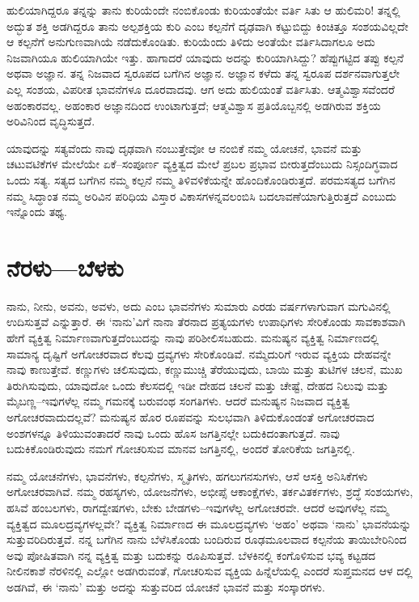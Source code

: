 ಹುಲಿಯಾಗಿದ್ದರೂ ತನ್ನನ್ನು ತಾನು ಕುರಿಯೆಂದೇ ನಂಬಿಕೊಂಡು ಕುರಿಯಂತೆಯೇ ವರ್ತಿ ಸಿತು ಆ ಹುಲಿಮರಿ! ತನ್ನಲ್ಲಿ ಅದ್ಭುತ ಶಕ್ತಿ ಅಡಗಿದ್ದರೂ ತಾನು ಅಲ್ಪಶಕ್ತಿಯ ಕುರಿ ಎಂಬ ಕಲ್ಪನೆಗೆ ದೃಢವಾಗಿ ಕಟ್ಟುಬಿದ್ದು ಕಿಂಚಿತ್ತೂ ಸಂಶಯವಿಲ್ಲದೇ ಆ ಕಲ್ಪನೆಗೆ ಅನುಗುಣವಾಗಿಯೆ ನಡೆದುಕೊಂಡಿತು. ಕುರಿಯೆಂದು ತಿಳಿದು ಅಂತೆಯೇ ವರ್ತಿಸಿದಾಗಲೂ ಅದು ನಿಜವಾಗಿಯೂ ಹುಲಿಯಾಗಿಯೇ ಇತ್ತು. ಹಾಗಾದರೆ ಯಾವುದು ಅದನ್ನು ಕುರಿಯಾಗಿಸಿದ್ದು? ಹೆಪ್ಪುಗಟ್ಟಿದ ತಪ್ಪು ಕಲ್ಪನೆ ಅಥವಾ ಅಜ್ಞಾನ. ತನ್ನ ನಿಜವಾದ ಸ್ವರೂಪದ ಬಗೆಗಿನ ಅಜ್ಞಾನ. ಅಜ್ಞಾನ ಕಳೆದು ತನ್ನ ಸ್ವರೂಪ ದರ್ಶನವಾಗುತ್ತಲೇ ಎಲ್ಲ ಸಂಶಯ, ವಿಪರೀತ ಭಾವನೆಗಳೂ ದೂರವಾದವು. ಆಗ ಅದು ಹುಲಿಯಂತೆ ವರ್ತಿಸಿತು. ಆತ್ಮವಿಶ್ವಾಸವೆಂದರೆ ಅಹಂಕಾರವಲ್ಲ. ಅಹಂಕಾರ ಅಜ್ಞಾನದಿಂದ ಉಂಟಾಗುತ್ತದೆ; ಆತ್ಮವಿಶ್ವಾಸ ಪ್ರತಿಯೊಬ್ಬನಲ್ಲಿ ಅಡಗಿರುವ ಶಕ್ತಿಯ ಅರಿವಿನಿಂದ ವೃದ್ಧಿಸುತ್ತದೆ.

ಯಾವುದನ್ನು ಸತ್ಯವೆಂದು ನಾವು ದೃಢವಾಗಿ ನಂಬುತ್ತೇವೋ ಆ ನಂಬಿಕೆ ನಮ್ಮ ಯೋಚನೆ, ಭಾವನೆ ಮತ್ತು ಚಟುವಟಿಕೆಗಳ ಮೇಲೆಯೇ ಏಕೆ–ಸಂಪೂರ್ಣ ವ್ಯಕ್ತಿತ್ವದ ಮೇಲೆ ಪ್ರಬಲ ಪ್ರಭಾವ ಬೀರುತ್ತದೆಂಬುದು ನಿಸ್ಸಂದಿಗ್ಧವಾದ ಒಂದು ಸತ್ಯ. ಸತ್ಯದ ಬಗೆಗಿನ ನಮ್ಮ ಕಲ್ಪನೆ ನಮ್ಮ ತಿಳಿವಳಿಕೆಯನ್ನೇ ಹೊಂದಿಕೊಂಡಿರುತ್ತದೆ. ಪರಮಸತ್ಯದ ಬಗೆಗಿನ ನಮ್ಮ ಸಿದ್ಧಾಂತ ನಮ್ಮ ಅರಿವಿನ ಪರಿಧಿಯ ವಿಸ್ತಾರ ವಿಕಾಸಗಳನ್ನವಲಂಬಿಸಿ ಬದಲಾವಣೆಯಾಗುತ್ತಿರುತ್ತದೆ ಎಂಬುದು ಇನ್ನೊಂದು ತಥ್ಯ.


\section*{ನೆರಳು—ಬೆಳಕು}


ನಾನು, ನೀನು, ಅವನು, ಅವಳು, ಅದು ಎಂಬ ಭಾವನೆಗಳು ಸುಮಾರು ಎರಡು ವರ್ಷಗಳಾಗುವಾಗ ಮಗುವಿನಲ್ಲಿ ಉದಿಸುತ್ತವೆ ಎನ್ನುತ್ತಾರೆ. ಈ ‘ನಾನು’ವಿಗೆ ನಾನಾ ತೆರನಾದ ಪ್ರತ್ಯಯಗಳು ಉಪಾಧಿಗಳು ಸೇರಿಕೊಂಡು ಸಾವಕಾಶವಾಗಿ ಹೇಗೆ ವ್ಯಕ್ತಿತ್ವ ನಿರ್ಮಾಣವಾಗುತ್ತದೆಂಬುದನ್ನು ನಾವು ಪರಿಶೀಲಿಸಬಹುದು. ಮನುಷ್ಯನ ವ್ಯಕ್ತಿತ್ವ ನಿರ್ಮಾಣದಲ್ಲಿ ಸಾಮಾನ್ಯ ದೃಷ್ಟಿಗೆ ಅಗೋಚರವಾದ ಕೆಲವು ದ್ರವ್ಯಗಳು ಸೇರಿಕೊಂಡಿವೆ. ನಮ್ಮೆದುರಿಗೆ ಇರುವ ವ್ಯಕ್ತಿಯ ದೇಹವನ್ನೇ ನಾವು ಕಾಣುತ್ತೇವೆ. ಕಣ್ಣುಗಳು ಚಲಿಸುವುದು, ಕಣ್ಣುಮುಚ್ಚಿ ತೆರೆಯುವುದು, ಬಾಯಿ ಮತ್ತು ತುಟಿಗಳ ಚಲನೆ, ಮುಖ ತಿರುಗಿಸುವುದು, ಯಾವುದೋ ಒಂದು ಕೆಲಸದಲ್ಲಿ ಇಡೀ ದೇಹದ ಚಲನೆ ಮತ್ತು ಚೇಷ್ಟೆ, ದೇಹದ ನಿಲುವು ಮತ್ತು ಮೈಬಣ್ಣ–ಇವುಗಳೆಲ್ಲ ನಮ್ಮ ಗಮನಕ್ಕೆ ಬರುವಂಥ ಸಂಗತಿಗಳು. ಆದರೆ ಮನುಷ್ಯನ ನಿಜವಾದ ವ್ಯಕ್ತಿತ್ವ ಅಗೋಚರವಾದುದಲ್ಲವೆ? ಮನುಷ್ಯನ ಹೊರ ರೂಪವನ್ನು ಸುಲಭವಾಗಿ ತಿಳಿದುಕೊಂಡಂತೆ ಅಗೋಚರವಾದ ಅಂಶಗಳನ್ನೂ ತಿಳಿಯುವಂತಾದರೆ ನಾವು ಒಂದು ಹೊಸ ಜಗತ್ತಿನಲ್ಲೇ ಬದುಕಿದಂತಾಗುತ್ತದೆ. ನಾವು ಬದುಕಿಕೊಂಡಿರುವುದು ನಮಗೆ ಗೋಚರಿಸುವ ಮಾನವ ಜಗತ್ತಿನಲ್ಲಿ, ಅಂದರೆ ತೋರಿಕೆಯ ಜಗತ್ತಿನಲ್ಲಿ.

ನಮ್ಮ ಯೋಚನೆಗಳು, ಭಾವನೆಗಳು, ಕಲ್ಪನೆಗಳು, ಸ್ಮೃತಿಗಳು, ಹಗಲುಗನಸುಗಳು, ಆಸೆ ಆಸಕ್ತಿ ಅನಿಸಿಕೆಗಳು ಅಗೋಚರವಾಗಿವೆ. ನಮ್ಮ ರಹಸ್ಯಗಳು, ಯೋಜನೆಗಳು, ಅಭೀಪ್ಸೆ ಆಕಾಂಕ್ಷೆಗಳು, ತರ್ಕವಿತರ್ಕಗಳು, ಶ್ರದ್ಧೆ ಸಂಶಯಗಳು, ಹಸಿವೆ ಹಂಬಲಗಳು, ರಾಗದ್ವೇಷಗಳು, ಬೇಕು ಬೇಡಗಳು–ಇವುಗಳೆಲ್ಲ ಅಗೋಚರವೇ. ಆದರೆ ಅವುಗಳೆಲ್ಲ ನಮ್ಮ ವ್ಯಕ್ತಿತ್ವದ ಮೂಲ\-ದ್ರವ್ಯ\-ಗಳಲ್ಲವೇ? ವ್ಯಕ್ತಿತ್ವ ನಿರ್ಮಾಣದ ಈ ಮೂಲದ್ರವ್ಯಗಳು ‘ಅಹಂ’ ಅಥವಾ ‘ನಾನು’ ಭಾವನೆಯನ್ನು ಸುತ್ತುವರಿದಿರುತ್ತವೆ. ನನ್ನ ಬಗೆಗಿನ ನಾನು ಬೆಳೆಸಿಕೊಂಡು ಬಂದಿರುವ ರೂಢಮೂಲವಾದ ಕಲ್ಪನೆಯ ತಾಯಿಬೇರಿನಿಂದ ಅವು ಪೋಷಿತವಾಗಿ ನನ್ನ ವ್ಯಕ್ತಿತ್ವ ಮತ್ತು ಬದುಕನ್ನು ರೂಪಿಸುತ್ತವೆ. ಬೆಳಕಿನಲ್ಲಿ ಕಂಗೊಳಿಸುವ ಭವ್ಯ ಕಟ್ಟಡದ ನೀಲಿನಕಾಶೆ ನೆರಳಿನಲ್ಲಿ ಎಲ್ಲೋ ಅಡಗಿರುವಂತೆ, ಗೋಚರಿಸುವ ವ್ಯಕ್ತಿಯ ಹಿನ್ನೆಲೆಯಲ್ಲಿ ಎಂದರೆ ಸುಪ್ತಮನದ ಆಳ ದಲ್ಲಿ ಅಡಗಿವೆ, ಈ ‘ನಾನು’ ಮತ್ತು ಅದನ್ನು ಸುತ್ತುವರಿದ ಯೋಚನೆ ಭಾವನೆ ಮತ್ತು ಸಂಸ್ಕಾರಗಳು.


